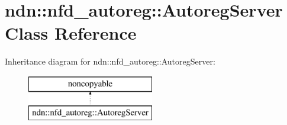 \hypertarget{classndn_1_1nfd__autoreg_1_1AutoregServer}{}\section{ndn\+:\+:nfd\+\_\+autoreg\+:\+:Autoreg\+Server Class Reference}
\label{classndn_1_1nfd__autoreg_1_1AutoregServer}
Inheritance diagram for ndn\+:\+:nfd\+\_\+autoreg\+:\+:Autoreg\+Server\+:\begin{figure}[H]
\begin{center}
\leavevmode
\includegraphics[height=2.000000cm]{classndn_1_1nfd__autoreg_1_1AutoregServer}
\end{center}
\end{figure}
